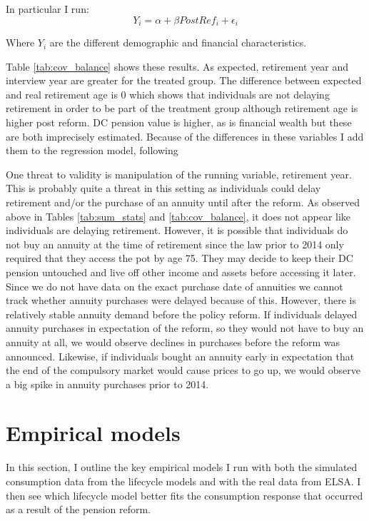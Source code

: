 \documentclass[12pt]{article}
\begin{document}
In particular I run:
\begin{equation*}
    Y_{i} = \alpha + \beta PostRef_{i}  + \epsilon_{i}
\end{equation*}

Where $Y_{i}$ are the different demographic and financial characteristics.


\linespread{1.25}

\linespread{1.5}



Table \ref{tab:cov_balance} shows these results. As expected, retirement year
and interview year are greater for the treated group. The difference between
expected and real retirement age is 0 which shows that individuals are not
delaying retirement in order to be part of the treatment group although
retirement age is higher post reform. DC pension value is higher, as is
financial wealth but these are both imprecisely estimated. Because of the
differences in these variables I add them to the regression model, following

One threat to validity is manipulation of the running variable, retirement year.
This is probably quite a threat in this setting as individuals could delay
retirement and/or the purchase of an annuity until after the reform. As observed
above in Tables \ref{tab:sum_stats} and \ref{tab:cov_balance}, it does not
appear like individuals are delaying retirement. However, it is possible that
individuals do not buy an annuity at the time of retirement since the law prior
to 2014 only required that they access the pot by age 75. They may decide to
keep their DC pension untouched and live off other income and assets before
accessing it later. Since we do not have data on the exact purchase date of
annuities we cannot track whether annuity purchases were delayed because of
this. However, there is relatively stable annuity demand before the policy
reform. If individuals delayed annuity purchases in expectation of the reform,
so they would not have to buy an annuity at all, we would observe declines in
purchases before the reform was announced. Likewise, if individuals bought an
annuity early in expectation that the end of the compulsory market would cause
prices to go up, we would observe a big spike in annuity purchases prior to
2014.


\section{Empirical models}

In this section, I outline the key empirical models I run with both the simulated
consumption data from the lifecycle models and with the real data from ELSA. I
then see which lifecycle model better fits the consumption response that
occurred as a result of the pension reform.
\end{document}
